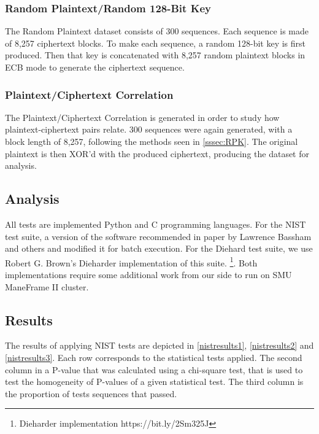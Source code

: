 \documentclass[conference]{IEEEtran}
\begin{document}
\subsubsection{Random Plaintext/Random 128-Bit Key} \label{sssec:RPK}
The Random Plaintext dataset consists of 300 sequences. Each sequence is made of 8,257 ciphertext blocks. To make each sequence, a random 128-bit key is first produced. Then that key is concatenated with 8,257 random plaintext blocks in ECB mode to generate the ciphertext sequence. 
\subsubsection{Plaintext/Ciphertext Correlation}
The Plaintext/Ciphertext Correlation is generated in order to study how plaintext-ciphertext pairs relate. 300 sequences were again generated, with a block length of 8,257, following the methods seen in \autoref{sssec:RPK}. The original plaintext is then XOR'd with the produced ciphertext, producing the dataset for analysis.
	
\subsection{Analysis}

All tests are implemented Python and C programming languages. For the NIST test suite, a version of the software recommended in paper by Lawrence Bassham and others \cite{nisttests} and modified it for batch execution. For the Diehard test suite, we use Robert G. Brown’s Dieharder implementation of this suite. \footnote{Dieharder implementation https://bit.ly/2Sm325J}. Both implementations require some additional work from our side to run on SMU ManeFrame II cluster.

\subsection{Results}

The results of applying NIST tests are depicted in \autoref{nistresults1}, \autoref{nistresults2} and \autoref{nistresults3}. Each row corresponds to the statistical tests applied. The second column in a P-value that was calculated using a chi-square test, that is used to test the homogeneity of P-values of a given statistical test. The third column is the proportion of tests sequences that passed.
\end{document}
